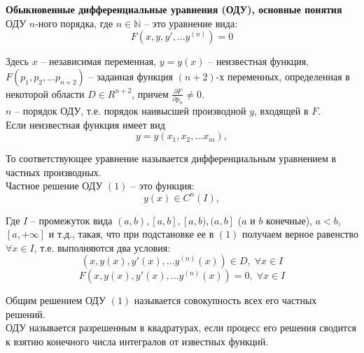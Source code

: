 \documentclass{article}
\begin{document}
	
	\textbf{Обыкновенные дифференциальные уравнения (ОДУ), основные понятия}\\

	ОДУ $n$-ного порядка, где $n\in\mathbb{N}$ -- это уравнение вида:
	\begin{equation}
		F(x,y,y',...y^{(n)}) = 0
	\end{equation}

	Здесь $x$ -- независимая переменная, $y=y(x)$ -- неизвестная функция, $F(p_1,p_2,...p_{n+2})$ -- заданная функция $(n+2)$-х переменных, определенная в некоторой области $D\in R^{n+2}$, причем $\frac{\partial F}{\partial p_n}\neq 0$.\\

	$n$ -- порядок ОДУ, т.е. порядок наивысшей производной $y$, входящей в $F$.\\

	Если неизвестная функция имеет вид
	\begin{equation}
		y=y(x_1,x_2,...x_m),
	\end{equation}

	То соответствующее уравнение называется дифференциальным уравнением в частных производных.\\

	Частное решение ОДУ $(1)$ -- это функция:
	\begin{equation}
		y(x) \in C^n(I),
	\end{equation}

	Где $I$ -- промежуток вида $(a,b), [a,b], [a,b), (a,b]$ ($a$ и $b$ конечные), $a<b$, $[a,+\infty]$ и т.д., такая, что при подстановке ее в $(1)$ получаем верное равенство $\forall x\in I$, т.е. выполняются два условия:
	\begin{equation}
		(x,y(x),y'(x),...y^{(n)}(x)) \in D,\;\forall x\in I
	\end{equation}
	\begin{equation}
		F(x,y(x),y'(x),...y^{(n)}(x)) = 0,\;\forall x\in I
	\end{equation}

	Общим решением ОДУ $(1)$ называется совокупность всех его частных решений.\\

	ОДУ называется разрешенным в квадратурах, если процесс его решения сводится к взятию конечного числа интегралов от известных функций.\\
\end{document}
